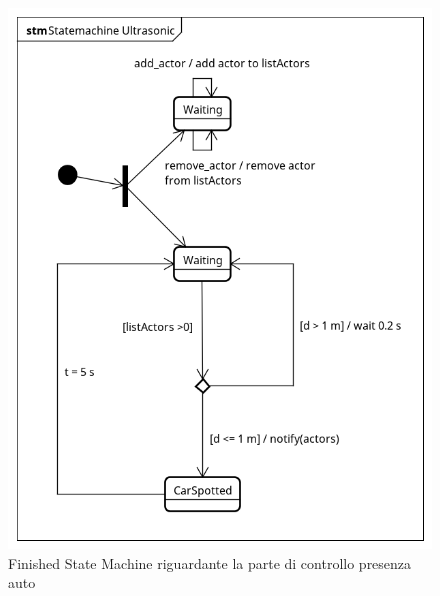 \begin{figure}[tbp]
	\centering
	\includegraphics[scale=.75]{figure/Statemachine_Ultrasonic.png}
	\caption{Finished State Machine riguardante la parte di controllo presenza auto \label{FSM CAR}}
\end{figure}
